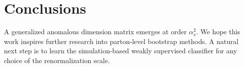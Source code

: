 \section{Conclusions}\label{sec:conclusions}

A generalized anomalous dimension matrix emerges at order $\alpha_s^2$.
We hope this work inspires further research into parton-level bootstrap
methods. A natural next step is to learn the simulation-based weakly
supervised classifier for any choice of the renormalization scale.

